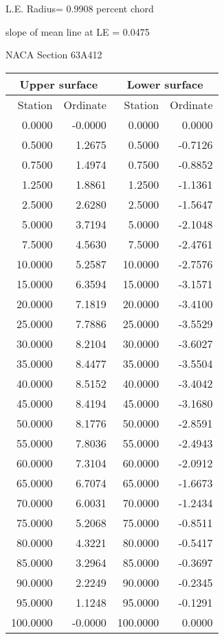 \documentclass[11pt]{book}
\begin{document}
L.E. Radius=  0.9908 percent chord


 slope of mean line at LE =  0.0475
 \newpage
  \label{s63A412}
 \begin{Large}
 NACA Section 63A412
 \end{Large}
  
 \vspace{8mm}
 \begin{tabular}{|r|r|r|r|} \hline 
 \multicolumn{2}{|c|}{Upper surface} & \multicolumn{2}{|c|}{Lower surface} \\
 \hline
 Station & Ordinate & Station & Ordinate \\
 \hline
0.0000 & -0.0000 & 0.0000 & 0.0000 \\
0.5000 & 1.2675 & 0.5000 & -0.7126 \\
0.7500 & 1.4974 & 0.7500 & -0.8852 \\
1.2500 & 1.8861 & 1.2500 & -1.1361 \\
2.5000 & 2.6280 & 2.5000 & -1.5647 \\
5.0000 & 3.7194 & 5.0000 & -2.1048 \\
7.5000 & 4.5630 & 7.5000 & -2.4761 \\
10.0000 & 5.2587 & 10.0000 & -2.7576 \\
15.0000 & 6.3594 & 15.0000 & -3.1571 \\
20.0000 & 7.1819 & 20.0000 & -3.4100 \\
25.0000 & 7.7886 & 25.0000 & -3.5529 \\
30.0000 & 8.2104 & 30.0000 & -3.6027 \\
35.0000 & 8.4477 & 35.0000 & -3.5504 \\
40.0000 & 8.5152 & 40.0000 & -3.4042 \\
45.0000 & 8.4194 & 45.0000 & -3.1680 \\
50.0000 & 8.1776 & 50.0000 & -2.8591 \\
55.0000 & 7.8036 & 55.0000 & -2.4943 \\
60.0000 & 7.3104 & 60.0000 & -2.0912 \\
65.0000 & 6.7074 & 65.0000 & -1.6673 \\
70.0000 & 6.0031 & 70.0000 & -1.2434 \\
75.0000 & 5.2068 & 75.0000 & -0.8511 \\
80.0000 & 4.3221 & 80.0000 & -0.5417 \\
85.0000 & 3.2964 & 85.0000 & -0.3697 \\
90.0000 & 2.2249 & 90.0000 & -0.2345 \\
95.0000 & 1.1248 & 95.0000 & -0.1291 \\
100.0000 & -0.0000 & 100.0000 & 0.0000 \\
 \hline 
 \end{tabular}
\end{document}
